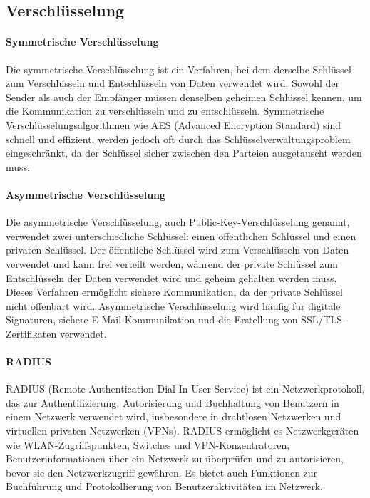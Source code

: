 \subsection{Verschlüsselung}

\paragraph{Symmetrische Verschlüsselung}

Die symmetrische Verschlüsselung ist ein Verfahren, bei dem derselbe Schlüssel zum Verschlüsseln und Entschlüsseln von Daten verwendet wird. Sowohl der Sender als auch der Empfänger müssen denselben geheimen Schlüssel kennen, um die Kommunikation zu verschlüsseln und zu entschlüsseln. Symmetrische Verschlüsselungsalgorithmen wie AES (Advanced Encryption Standard) sind schnell und effizient, werden jedoch oft durch das Schlüsselverwaltungsproblem eingeschränkt, da der Schlüssel sicher zwischen den Parteien ausgetauscht werden muss.

\paragraph{Asymmetrische Verschlüsselung}

Die asymmetrische Verschlüsselung, auch Public-Key-Verschlüsselung genannt, verwendet zwei unterschiedliche Schlüssel: einen öffentlichen Schlüssel und einen privaten Schlüssel. Der öffentliche Schlüssel wird zum Verschlüsseln von Daten verwendet und kann frei verteilt werden, während der private Schlüssel zum Entschlüsseln der Daten verwendet wird und geheim gehalten werden muss. Dieses Verfahren ermöglicht sichere Kommunikation, da der private Schlüssel nicht offenbart wird. Asymmetrische Verschlüsselung wird häufig für digitale Signaturen, sichere E-Mail-Kommunikation und die Erstellung von SSL/TLS-Zertifikaten verwendet.

\paragraph{RADIUS}

RADIUS (Remote Authentication Dial-In User Service) ist ein Netzwerkprotokoll, das zur Authentifizierung, Autorisierung und Buchhaltung von Benutzern in einem Netzwerk verwendet wird, insbesondere in drahtlosen Netzwerken und virtuellen privaten Netzwerken (VPNs). RADIUS ermöglicht es Netzwerkgeräten wie WLAN-Zugriffspunkten, Switches und VPN-Konzentratoren, Benutzerinformationen über ein Netzwerk zu überprüfen und zu autorisieren, bevor sie den Netzwerkzugriff gewähren. Es bietet auch Funktionen zur Buchführung und Protokollierung von Benutzeraktivitäten im Netzwerk.

